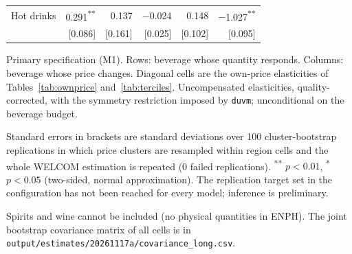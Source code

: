 \begin{table}[!htbp]
\begin{threeparttable}
\begin{tabular}{lrrrrr}
Hot drinks & 0.291\textsuperscript{**} & 0.137 & $-$0.024 & 0.148 & $-$1.027\textsuperscript{**} \\
 & [0.086] & [0.161] & [0.025] & [0.102] & [0.095] \\
\bottomrule
\end{tabular}
\begin{tablenotes}[flushleft]
\footnotesize
\item Primary specification (M1). Rows: beverage whose quantity responds. Columns: beverage whose price changes. Diagonal cells are the own-price elasticities of Tables~\ref{tab:ownprice} and~\ref{tab:terciles}. Uncompensated elasticities, quality-corrected, with the symmetry restriction imposed by \texttt{duvm}; unconditional on the beverage budget.
\item Standard errors in brackets are standard deviations over 100 cluster-bootstrap replications in which price clusters are resampled within region cells and the whole WELCOM estimation is repeated (0 failed replications). \textsuperscript{**} $p<0.01$, \textsuperscript{*} $p<0.05$ (two-sided, normal approximation). The replication target set in the configuration has not been reached for every model; inference is preliminary.
\item Spirits and wine cannot be included (no physical quantities in ENPH). The joint bootstrap covariance matrix of all cells is in \texttt{output/estimates/20261117a/covariance\_long.csv}.
\end{tablenotes}
\end{threeparttable}
\end{table}
